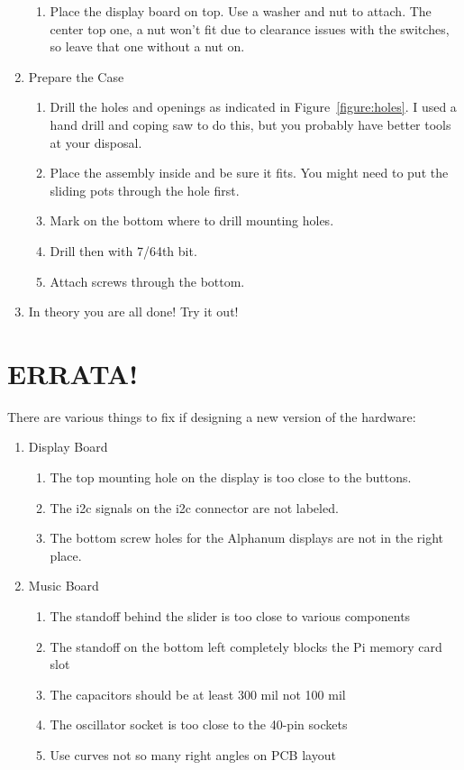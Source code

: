 \documentclass[11pt]{article}
\begin{document}
\begin{enumerate}
\begin{enumerate}
		\item Place the display board on top.
			Use a washer and nut to attach.
			The center top one, a nut won't fit due to clearance issues with
			the switches, so leave that one without a nut on.

		\end{enumerate}

	\item Prepare the Case
		\begin{enumerate}
		\item	Drill the holes and openings as indicated in
			Figure~\ref{figure:holes}.
			I used a hand drill and coping saw to do this, but you
			probably have better tools at your disposal.
		\item Place the assembly inside and be sure it fits.
			You might need to put the sliding pots through the hole first.
		\item Mark on the bottom where to drill mounting holes.
		\item Drill then with 7/64th bit.
		\item Attach screws through the bottom.
		\end{enumerate}

	\item In theory you are all done!  Try it out!

\end{enumerate}


\section{ERRATA!}

There are various things to fix if designing a new version of the
hardware:
\begin{enumerate}
\item Display Board
	\begin{enumerate}
	\item The top mounting hole on the display is too close to the buttons.
	\item The i2c signals on the i2c connector are not labeled.
	\item The bottom screw holes for the Alphanum displays are not in
		the right place.
	\end{enumerate}
\item Music Board
	\begin{enumerate}
	\item The standoff behind the slider is too close to various components
	\item The standoff on the bottom left completely blocks the Pi
		memory card slot
	\item The capacitors should be at least 300 mil not 100 mil
	\item The oscillator socket is too close to the 40-pin sockets
	\item Use curves not so many right angles on PCB layout
	\end{enumerate}
\end{enumerate}




\end{document}
